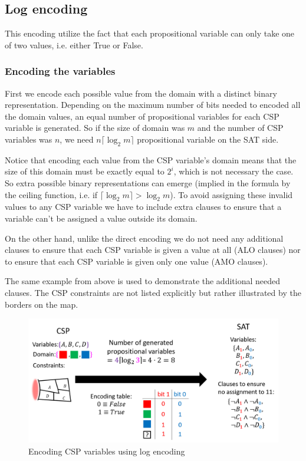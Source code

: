 \subsection{Log encoding}
This encoding utilize the fact that each propositional variable can only take one of two values, i.e. either True or False.

\subsubsection{Encoding the variables}
First we encode each possible value from the domain with a distinct binary representation. Depending on the maximum number of bits needed to encoded all the domain values, an equal number of propositional variables for each CSP variable is generated. So if the size of domain was $m$ and the number of CSP variables was $n$, we need $n \lceil \log_2 m \rceil$ propositional variable on the SAT side.

Notice that encoding each value from the CSP variable's domain means that the size of this domain must be exactly equal to $2^i$, which is not necessary the case. So extra possible binary representations can emerge (implied in the formula by the ceiling function, i.e. if $ \lceil \log_2 m \rceil > \log_2 m $). To avoid assigning these invalid values to any CSP variable we have to include extra clauses to ensure that a variable can't be assigned a value outside its domain. 

On the other hand, unlike the direct encoding we do not need any additional clauses to ensure that each CSP variable is given a value at all (ALO clauses) nor to ensure that each CSP variable is given only one value (AMO clauses).

The same example from above is used to demonstrate the additional needed clauses. The CSP constraints are not listed explicitly but rather illustrated by the borders on the map.

\begin{figure}[H]
	\centering
	\includegraphics[width=0.85\linewidth]{assets/log_variables}
	\captionsetup{justification=centering,margin=2cm}
	\caption{Encoding CSP variables using log encoding}
	\label{fig:log_variables}
\end{figure}

